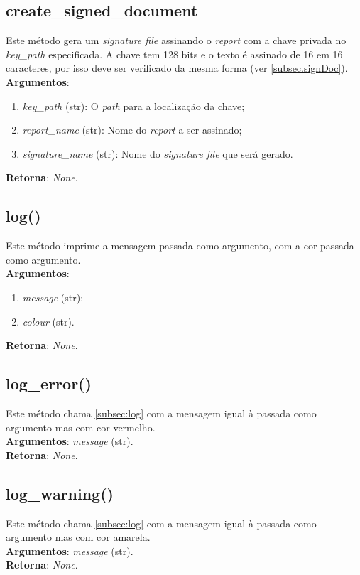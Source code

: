 \documentclass{report}
\begin{document}
\subsection{create\_signed\_document}
\label{subsec.signDoc}
Este método gera um \textit{signature file} assinando o \textit{report} com a chave privada no \textit{key\_path} especificada. A chave tem 128 bits e o texto é assinado de 16 em 16 caracteres, por isso deve ser verificado da mesma forma (ver \autoref{subsec.signDoc}). \\ 
\textbf{Argumentos}: 
\begin{enumerate}
\item \textit{key\_path} (str): O \textit{path} para a localização da chave;
\item \textit{report\_name} (str): Nome do \textit{report} a ser assinado;
\item \textit{signature\_name} (str): Nome do \textit{signature file} que será gerado.	
\end{enumerate}
\textbf{Retorna}: \textit{None}.

\subsection{log()}
\label{subsec:log}
Este método imprime a mensagem passada como argumento, com a cor passada como argumento.\\ 
\textbf{Argumentos}: 
\begin{enumerate}
\item \textit{message} (str);
\item \textit{colour} (str).
\end{enumerate}
\textbf{Retorna}: \textit{None}.

\subsection{log\_error()}
Este método chama \autoref{subsec:log} com a mensagem igual à passada como argumento mas com cor vermelho.\\ 
\textbf{Argumentos}:
\textit{message} (str).\\
\textbf{Retorna}: \textit{None}.

\subsection{log\_warning()}
Este método chama \autoref{subsec:log} com a mensagem igual à passada como argumento mas com cor amarela.\\ 
\textbf{Argumentos}:
\textit{message} (str).\\
\textbf{Retorna}: \textit{None}.
\end{document}
